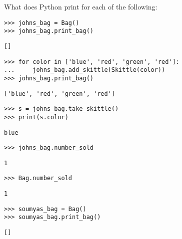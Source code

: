 \question What does Python print for each of the following:

\begin{lstlisting}
>>> johns_bag = Bag()
>>> johns_bag.print_bag()
\end{lstlisting}
\begin{solution}[.2in]
\begin{lstlisting}
[]
\end{lstlisting}
\end{solution}

\begin{lstlisting}
>>> for color in ['blue', 'red', 'green', 'red']:
...     johns_bag.add_skittle(Skittle(color))
>>> johns_bag.print_bag()
\end{lstlisting}
\begin{solution}[.2in]
\begin{lstlisting}
['blue', 'red', 'green', 'red']
\end{lstlisting}
\end{solution}

\begin{lstlisting}
>>> s = johns_bag.take_skittle()
>>> print(s.color)
\end{lstlisting}
\begin{solution}[.2in]
\begin{lstlisting}
blue
\end{lstlisting}
\end{solution}

\begin{lstlisting}
>>> johns_bag.number_sold
\end{lstlisting}
\begin{solution}[.2in]
\begin{lstlisting}
1
\end{lstlisting}
\end{solution}

\begin{lstlisting}
>>> Bag.number_sold
\end{lstlisting}
\begin{solution}[.2in]
\begin{lstlisting}
1
\end{lstlisting}
\end{solution}

\begin{lstlisting}
>>> soumyas_bag = Bag()
>>> soumyas_bag.print_bag()
\end{lstlisting}
\begin{solution}[.2in]
\begin{lstlisting}
[]
\end{lstlisting}
\end{solution}

